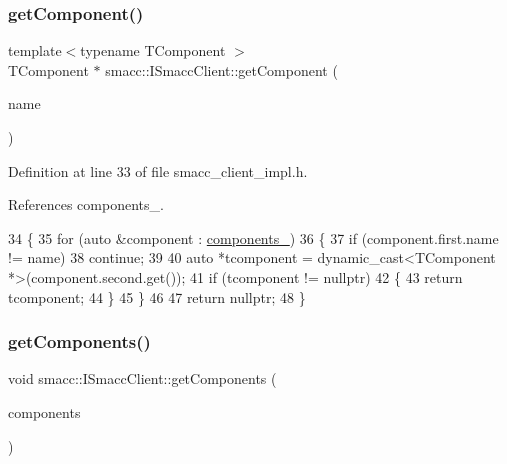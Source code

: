 \subsubsection{\texorpdfstring{get\+Component()}{getComponent()}\hspace{0.1cm}{\footnotesize\ttfamily [2/2]}}
{\footnotesize\ttfamily template$<$typename T\+Component $>$ \\
T\+Component $\ast$ smacc\+::\+I\+Smacc\+Client\+::get\+Component (\begin{DoxyParamCaption}\item[{std\+::string}]{name }\end{DoxyParamCaption})}



Definition at line 33 of file smacc\+\_\+client\+\_\+impl.\+h.



References components\+\_\+.


\begin{DoxyCode}
34 \{
35     \textcolor{keywordflow}{for} (\textcolor{keyword}{auto} &component : \hyperlink{classsmacc_1_1ISmaccClient_a9e670e9071bb549dbeb08985d0114afe}{components\_})
36     \{
37         \textcolor{keywordflow}{if} (component.first.name != name)
38             \textcolor{keywordflow}{continue};
39 
40         \textcolor{keyword}{auto} *tcomponent = \textcolor{keyword}{dynamic\_cast<}TComponent *\textcolor{keyword}{>}(component.second.get());
41         \textcolor{keywordflow}{if} (tcomponent != \textcolor{keyword}{nullptr})
42         \{
43             \textcolor{keywordflow}{return} tcomponent;
44         \}
45     \}
46 
47     \textcolor{keywordflow}{return} \textcolor{keyword}{nullptr};
48 \}
\end{DoxyCode}
\mbox{\label{classsmacc_1_1ISmaccClient_ac6db21c1ec7072178e9f7c721908e07d}} 
\subsubsection{\texorpdfstring{get\+Components()}{getComponents()}}
{\footnotesize\ttfamily void smacc\+::\+I\+Smacc\+Client\+::get\+Components (\begin{DoxyParamCaption}\item[{std\+::vector$<$ std\+::shared\+\_\+ptr$<$ \hyperlink{classsmacc_1_1ISmaccComponent}{I\+Smacc\+Component} $>$$>$ \&}]{components }\end{DoxyParamCaption})\hspace{0.3cm}{\ttfamily [inline]}}



